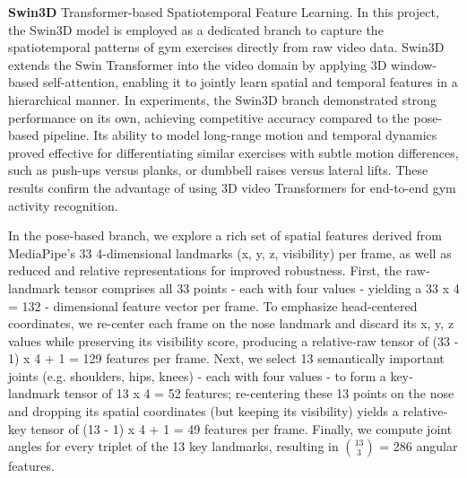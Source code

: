 \documentclass[journal,onecolumn, 11pt]{IEEEtran}
\begin{document}
\textbf{Swin3D} Transformer-based Spatiotemporal Feature Learning. In this project, the Swin3D model is employed as a dedicated branch to capture the spatiotemporal patterns of gym exercises directly from raw video data. Swin3D extends the Swin Transformer into the video domain by applying 3D window-based self-attention, enabling it to jointly learn spatial and temporal features in a hierarchical manner. In experiments, the Swin3D branch demonstrated strong performance on its own, achieving competitive accuracy compared to the pose-based pipeline. Its ability to model long-range motion and temporal dynamics proved effective for differentiating similar exercises with subtle motion differences, such as push-ups versus planks, or dumbbell raises versus lateral lifts. These results confirm the advantage of using 3D video Transformers for end-to-end gym activity recognition. \cite{liu2021}
	


In the pose‐based branch, we explore a rich set of spatial features derived from MediaPipe’s 33 4-dimensional landmarks (x, y, z, visibility) per frame, as well as reduced and relative representations for improved robustness. First, the raw‐landmark tensor comprises all 33 points - each with four values - yielding a 33 x 4 = 132 - dimensional feature vector per frame. To emphasize head‐centered coordinates, we re-center each frame on the nose landmark and discard its x, y, z values while preserving its visibility score, producing a relative‐raw tensor of (33 - 1) x 4 + 1 = 129 features per frame. Next, we select 13 semantically important joints (e.g. shoulders, hips, knees) - each with four values - to form a key‐landmark tensor of 13 x 4 = 52 features; re-centering these 13 points on the nose and dropping its spatial coordinates (but keeping its visibility) yields a relative‐key tensor of (13 - 1) x 4 + 1 = 49 features per frame. Finally, we compute joint angles for every triplet of the 13 key landmarks, resulting in $\binom{13}{3}$ = 286 angular features.
\end{document}
